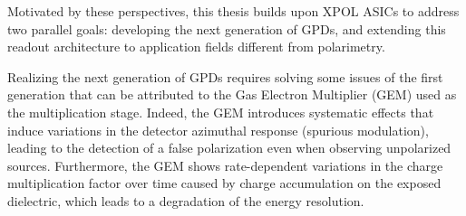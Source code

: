 \documentclass[12pt, a4paper]{article}
\begin{document}
Motivated by these perspectives, this thesis builds upon XPOL ASICs to address two parallel goals: developing the next generation of GPDs, and extending this readout architecture to application fields different from polarimetry.




Realizing the next generation of GPDs requires solving some issues of the first generation that can be attributed to the Gas Electron Multiplier (GEM) used as the multiplication stage. Indeed, the GEM introduces systematic effects that induce variations in the detector azimuthal response (spurious modulation), leading to the detection of a false polarization even when observing unpolarized sources. Furthermore, the GEM shows rate-dependent variations in the charge multiplication factor over time caused by charge accumulation on the exposed dielectric, which leads to a degradation of the energy resolution.
\end{document}
